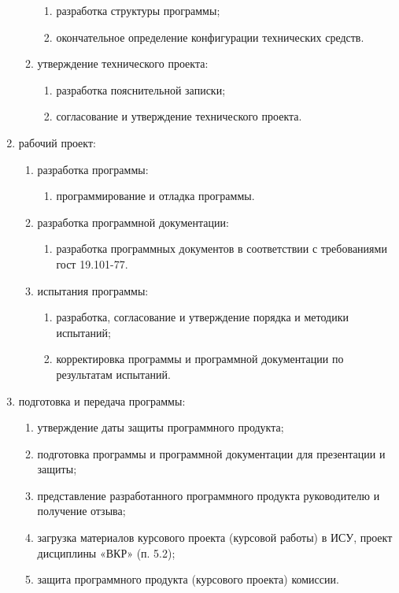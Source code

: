 \begin{enumerate}
\begin{enumerate}
\begin{enumerate}
            \item разработка структуры программы;
            \item окончательное определение конфигурации технических средств.
        \end{enumerate}
        \item утверждение технического проекта:
        \begin{enumerate}
            \item разработка пояснительной записки;
            \item согласование и утверждение технического проекта.
        \end{enumerate}
    \end{enumerate}
    \item рабочий проект:
    \begin{enumerate}
        \item разработка программы:
        \begin{enumerate}
            \item программирование и отладка программы.
        \end{enumerate}
        \item разработка программной документации:
        \begin{enumerate}
            \item разработка программных документов в соответствии с требованиями гост 19.101-77.
        \end{enumerate}
        \item испытания программы:
        \begin{enumerate}
            \item разработка, согласование и утверждение порядка и методики испытаний;
            \item корректировка программы и программной документации по результатам испытаний.
        \end{enumerate}
    \end{enumerate}
    \item подготовка и передача программы:
    \begin{enumerate}
        \item утверждение даты защиты программного продукта;
        \item подготовка программы и программной документации для презентации и защиты;
        \item представление разработанного программного продукта руководителю и получение отзыва;
        \item загрузка материалов курсового проекта (курсовой работы) в ИСУ, проект дисциплины «ВКР» (п. 5.2);
        \item защита программного продукта (курсового проекта) комиссии.
    \end{enumerate}
\end{enumerate}

